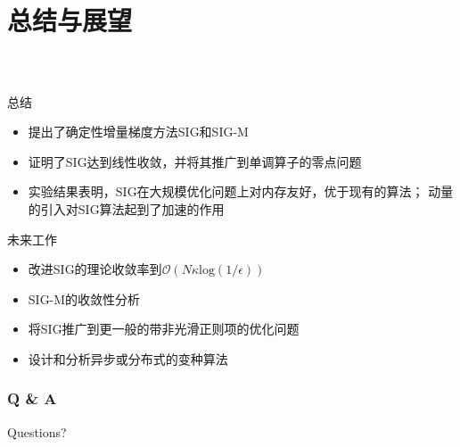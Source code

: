 \section{总结与展望}
\miniframesoff
  \frame
  {
    \frametitle{\secname~ }
    \footnotesize
    \begin{block}{总结}
    \begin{itemize}
        \item 提出了确定性增量梯度方法SIG和SIG-M
        \item 证明了SIG达到线性收敛，并将其推广到单调算子的零点问题
        \item 实验结果表明，SIG在大规模优化问题上对内存友好，优于现有的算法；
              动量的引入对SIG算法起到了加速的作用
    \end{itemize}
    \end{block}

    \pause

    \begin{block}{未来工作}
    \begin{itemize}
        \item 改进SIG的理论收敛率到$\mathcal{O}(N\kappa \mathrm{log}(1/\epsilon))$
        \item SIG-M的收敛性分析
        \item 将SIG推广到更一般的带非光滑正则项的优化问题
        \item 设计和分析异步或分布式的变种算法
    \end{itemize}
    \end{block}
  }


  \frame
  {
    \frametitle{Q \& A}
    \begin{block}{Questions?}
      ~\\ ~\\
      \\ ~\\ ~\\ ~\\ ~\\
    \end{block}
  }

